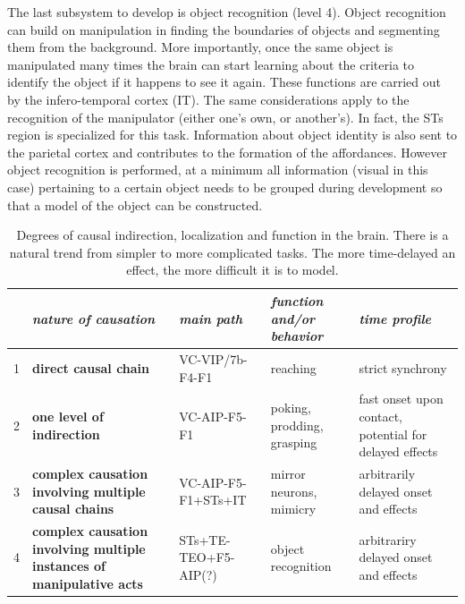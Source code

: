 The last subsystem to develop is object recognition (level 4). Object 
recognition can build on manipulation in finding the boundaries
of objects and segmenting them from the background. More importantly,
once the same object is manipulated many times the brain can
start learning about the criteria to identify the object if 
it happens to see it again. These functions are
carried out by the infero-temporal cortex (IT).
The same considerations apply to the recognition of the 
manipulator (either one's own, or another's). In fact, the STs region is specialized
for this task. Information about object identity is
also sent to the parietal cortex and contributes to 
the formation of the affordances. 
However object recognition is performed, at a minimum all information (visual in this case) pertaining to a certain object
needs to be grouped during development so that a model of the object can be constructed.

\begin{table}[htbp]
\begin{center}
\begin{tabular}{|p{0.3cm}|p{3.5cm}|p{2.5cm}|p{3cm}|p{3.5cm}|}
\hline
 & {\it nature of causation} & {\it main path} &  {\it function and/or behavior} & {\it time profile} \\ \hline\hline
{1} & {\bf direct causal chain} & VC-VIP/7b-F4-F1 & reaching & strict synchrony \\ \hline
{2} & {\bf one level of indirection} & VC-AIP-F5-F1 & poking, prodding, grasping & fast onset upon contact, potential for delayed effects \\ \hline
{3} & {\bf complex causation involving multiple causal chains} & VC-AIP-F5-F1+STs+IT & mirror neurons, mimicry & arbitrarily delayed onset and effects \\ \hline
{4} & {\bf complex causation involving multiple instances of manipulative acts} & STs+TE-TEO+F5-AIP(?) & object recognition & arbitrariry delayed onset and effects \\ \hline
\end{tabular}
\caption{
%
Degrees of causal indirection, localization and function in the brain.
There is a natural trend from simpler to more complicated tasks.  The more time-delayed
an effect, the more difficult it is to model.
%
}
\label{tab:circuits}
\end{center}
\end{table}

